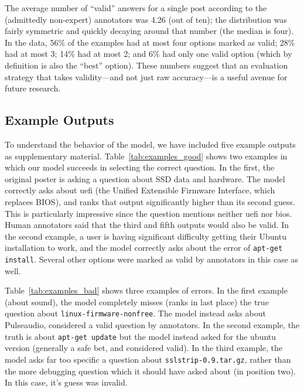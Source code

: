 \documentclass[11pt,a4paper]{article}
\begin{document}
The average number of ``valid'' answers for a single post according to the (admittedly non-expert) annotators was 4.26 (out of ten); the distribution was fairly symmetric and quickly decaying around that number (the median is four).
In the data, 56\% of the examples had at most four options marked as valid; 
28\% had at most 3; 14\% had at most 2; and 6\% had only one valid option (which by definition is also the ``best'' option).
These numbers suggest that an evaluation strategy that takes validity---and not just raw accuracy---is a useful avenue for future research.


\subsection{Example Outputs}

To understand the behavior of the model, we have included five example outputs as supplementary material.
Table~\ref{tab:examples_good} shows two examples in which our model succeeds in selecting the correct question.
In the first, the original poster is asking a question about SSD data and hardware.
The model correctly asks about uefi (the Unified Extensible Firmware Interface, which replaces BIOS), and ranks that output significantly higher than its second guess.
This is particularly impressive since the question mentions neither uefi nor bios. Human annotators said that the third and fifth outputs would also be valid. In the second example, a user is having significant difficulty getting their Ubuntu installation to work, and the model correctly asks about the error of \texttt{\small apt-get install}.
Several other options were marked as valid by annotators in this case as well.

Table~\ref{tab:examples_bad} shows three examples of errors.
In the first example (about sound), the model
completely misses (ranks in last place) the true question about \texttt{\small linux-firmware-nonfree}.
The model instead asks about Pulseaudio, considered a valid question by annotators.
In the second example, the truth is about \texttt{\small apt-get update} but the model instead asked for the ubuntu version (generally a safe bet, and considered valid). %
In the third example, the model asks far too specific a question about \texttt{\small sslstrip-0.9.tar.gz}, rather than the more debugging question which it should have asked about (in position two).
In this case, it's guess was invalid.
\end{document}
